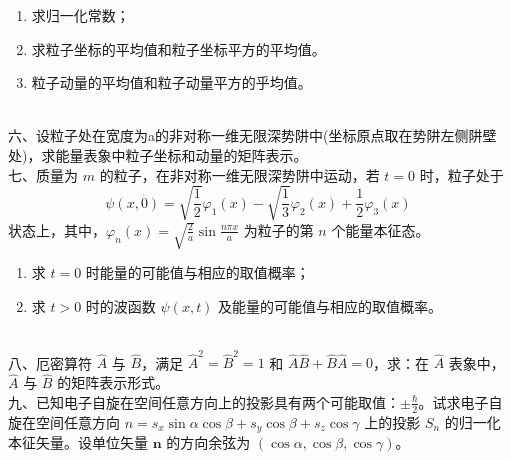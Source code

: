 \begin{enumerate}
    \item 求归一化常数；
    \item 求粒子坐标的平均值和粒子坐标平方的平均值。
    \item 粒子动量的平均值和粒子动量平方的乎均值。
\end{enumerate}\\
六、设粒子处在宽度为a的非对称一维无限深势阱中(坐标原点取在势阱左侧阱壁处)，求能量表象中粒子坐标和动量的矩阵表示。\\
七、质量为 $m$ 的粒子，在非对称一维无限深势阱中运动，若 $t=0$ 时，粒子处于
\[
\psi(x,0) = \sqrt{\frac{1}{2}} \varphi_1(x) - \sqrt{\frac{1}{3}} \varphi_2(x) + \frac{1}{2} \varphi_3(x)~
\]
状态上，其中，$\varphi_n(x) = \sqrt{\frac{2}{a}} \sin \frac{n\pi x}{a}$ 为粒子的第 $n$ 个能量本征态。

\begin{enumerate}
    \item 求 $t=0$ 时能量的可能值与相应的取值概率；
    \item 求 $t>0$ 时的波函数 $\psi(x,t)$ 及能量的可能值与相应的取值概率。
\end{enumerate}\\
八、厄密算符 $\hat{A}$ 与 $\hat{B}$，满足 $\hat{A}^2 = \hat{B}^2 = 1$ 和 $\hat{A}\hat{B} + \hat{B}\hat{A} = 0$，求：在 $\hat{A}$ 表象中，$\hat{A}$ 与 $\hat{B}$ 的矩阵表示形式。\\
九、已知电子自旋在空间任意方向上的投影具有两个可能取值：$\pm \frac{\hbar}{2}$。试求电子自旋在空间任意方向 $n = s_x \sin\alpha \cos\beta + s_y \cos\beta + s_z \cos\gamma$ 上的投影 $S_n$ 的归一化本征矢量。设单位矢量 $\mathbf{n}$ 的方向余弦为 $(\cos \alpha, \cos \beta, \cos \gamma)$。